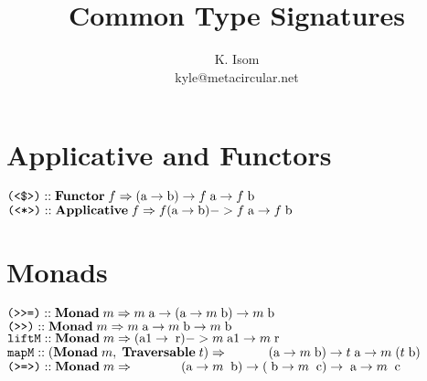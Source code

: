 \documentclass[10pt,twocolumn]{article}
\title{Common Type Signatures}
\author{K. Isom\\kyle@metacircular.net}
\begin{document}
\maketitle

\section{Applicative and Functors}

\begin{math}
\verb|(<$>)| :: \textbf{Functor}\;f \Rightarrow (\textrm{a} \to \textrm{b}) \to f\;\textrm{a} \to f\;\textrm{b}
\end{math}
\\
\begin{math}
\verb|(<*>)| :: \textbf{Applicative}\;f \Rightarrow f (\textrm{a} \to \textrm{b}) -> f\;\textrm{a} \to f\;\textrm{b}
\end{math}

\section{Monads}
\begin{math}
\verb|(>>=)| :: \textbf{Monad}\; m \Rightarrow m\;\textrm{a} \to (\textrm{a} \to m\; \textrm{b}) \to m\; \textrm{b}
\end{math}
\\
\begin{math}
\verb|(>>)| :: \textbf{Monad} \;m \Rightarrow m \;\textrm{a} \to m \;\textrm{b} \to m \;\textrm{b}
\end{math}
\\
\begin{math}
\verb|liftM| :: \textbf{Monad}\; m \Rightarrow (\textrm{a1} \to \;\textrm{r}) -> m \;\textrm{a1} \to m \;\textrm{r}
\end{math}
\\
\begin{math}
\verb|mapM| :: (\textbf{Monad}\; m,\;\textbf{Traversable}\; t) \Rightarrow\\
\verb|      |(\textrm{a} \to m \;\textrm{b}) \to t \;\textrm{a} \to m\;(t \;\textrm{b})
\end{math}
\\
\begin{math}
\verb|(>=>)| :: \textbf{Monad}\; m \Rightarrow\\
\verb|       |(\textrm{a} \to m \;\;\textrm{b}) \to (\;\textrm{b} \to m \;\;\textrm{c}) \to \;\textrm{a} \to m \;\;\textrm{c}
\end{math}
\end{document}

